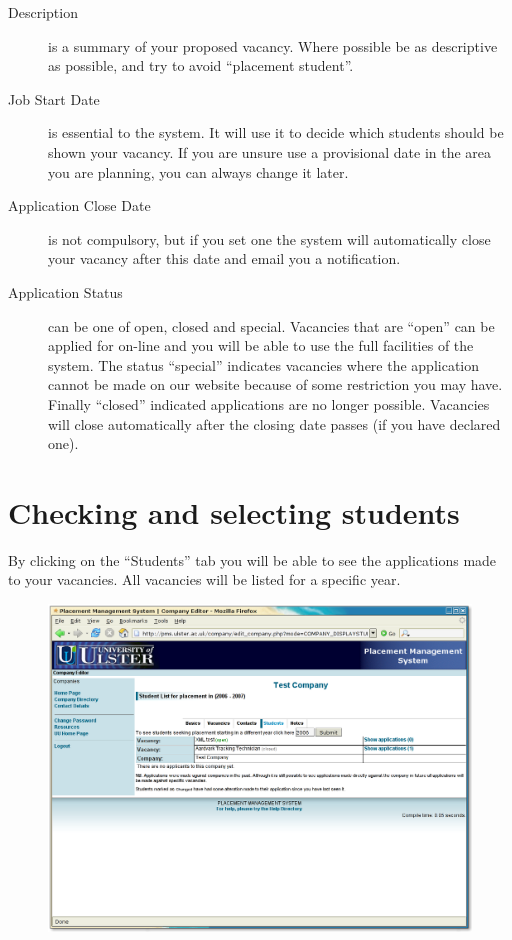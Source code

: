 \begin{description}
\item[Description] is a summary of your proposed vacancy. Where
possible be as descriptive as possible, and try to avoid
``placement student''.
\item[Job Start Date] is essential to the system. It will use it to
decide which students should be shown your vacancy. If you are 
unsure use a provisional date in the area you are planning, you
can always change it later.
\item[Application Close Date] is not compulsory, but if you set
one the system will automatically close your vacancy after this
date and email you a notification.
\item[Application Status] can be one of open, closed and special.
Vacancies that are ``open'' can be applied for on-line and you
will be able to use the full facilities of the system. The
status ``special'' indicates vacancies where the application
cannot be made on our website because of some restriction you
may have. Finally ``closed'' indicated applications are no
longer possible. Vacancies will close automatically after the
closing date passes (if you have declared one).
\end{description}

\section{Checking and selecting students}

By clicking on the ``Students'' tab you will be able to see
the applications made to your vacancies. All vacancies will be
listed for a specific year.
\begin{figure}[htb]
\begin{center}
\includegraphics[scale=0.25]{png/company_hr5.png}
\end{center}
\end{figure}

